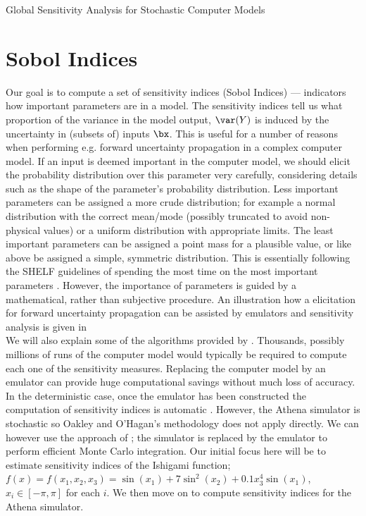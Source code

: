 \begin{chapter}{Global Sensitivity Analysis for Stochastic Computer Models}
\section{Sobol Indices}

Our goal is to compute a set of sensitivity indices (Sobol Indices) --- indicators how important parameters are in a model. The sensitivity indices tell us what proportion of the variance in the model output, $\var(Y)$ is induced by the uncertainty in (subsets of) inputs $\bx$. This is useful for a number of reasons when performing e.g. forward uncertainty propagation in a complex computer model. If an input is deemed important in the computer model, we should elicit the probability distribution over this parameter very carefully, considering details such as the shape of the parameter's probability distribution. Less important parameters can be assigned a more crude distribution; for example a normal distribution with the correct mean/mode (possibly truncated to avoid non-physical values) or a uniform distribution with appropriate limits. The least important parameters can be assigned a point mass for a plausible value, or like above be assigned a simple, symmetric distribution. This is essentially following the SHELF guidelines of spending the most time on the most important parameters \citep{SHELF4}. However, the importance of parameters is guided by a mathematical, rather than subjective procedure. An illustration how a elicitation for forward uncertainty propagation can be assisted by emulators and sensitivity analysis is given in \\

We will also explain some of the algorithms provided by \citet{Sobol1993}. Thousands, possibly millions of runs of the computer model would typically be required to compute each one of the sensitivity measures. Replacing the computer model by an emulator can provide huge computational savings without much loss of accuracy. In the deterministic case, once the emulator has been constructed the computation of sensitivity indices is automatic \citep{Oakley04}. However, the Athena simulator is stochastic so Oakley and O'Hagan's methodology does not apply directly. We can however use the approach of \citet{Marrel2012}; the simulator is replaced by the emulator to perform efficient Monte Carlo integration. Our initial focus here will be to estimate sensitivity indices of the Ishigami function; $f(x) = f(x_1, x_2, x_3) = \sin(x_1) + 7 \sin^2(x_2) + 0.1 x_3^4 \sin(x_1)$, $x_i \in [-\pi, \pi]$ for each $i$. We then move on to compute sensitivity indices for the Athena simulator.\\


\end{chapter}
